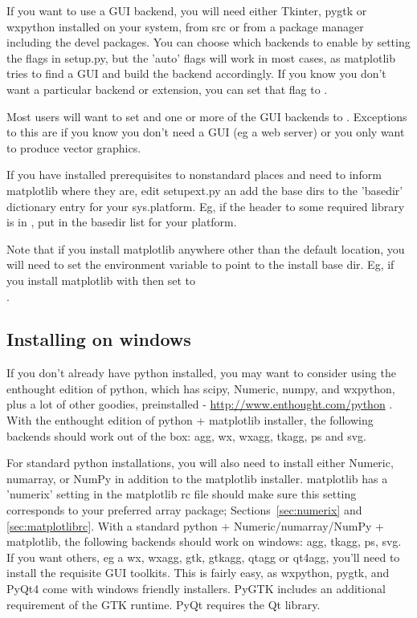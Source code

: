 \documentclass[twoside]{book}
\begin{document}
If you want to use a GUI backend, you will need either Tkinter, pygtk or 
wxpython installed on your system, from src or from a package manager 
including the devel packages.  You can choose which backends to enable 
by setting the flags in setup.py, but the 'auto' flags will work in most 
cases, as matplotlib tries to find a GUI and build the backend accordingly.  
If you know you don't want a particular backend or extension, you can set 
that flag to .
  
Most users will want to set  and one or more of
the GUI backends to .  Exceptions to this are if you know
you don't need a GUI (eg a web server) or you only want to produce
vector graphics.
  
If you have installed prerequisites to nonstandard places and need to
inform matplotlib where they are, edit setupext.py an add the base
dirs to the 'basedir' dictionary entry for your sys.platform.  Eg, if
the header to some required library is in
, put  in the
basedir list for your platform.
  
Note that if you install matplotlib anywhere other than the default
location, you will need to set the  environment
variable to point to the install base dir.  Eg, if you install
matplotlib with 
then set  to\\
.
 
    
\subsection{Installing on windows}

If you don't already have python installed, you may want to consider
using the enthought edition of python, which has scipy, Numeric, numpy, 
and wxpython, plus a lot of other goodies, preinstalled -
\url{http://www.enthought.com/python} .  With the enthought edition of
python + matplotlib installer, the following backends should work out
of the box: agg, wx, wxagg, tkagg, ps and svg.

For standard python installations, you will also need to install either 
Numeric, numarray, or NumPy in addition to the matplotlib installer.
matplotlib has a 'numerix' setting in the matplotlib rc file should make 
sure this setting corresponds to your preferred array package; 
Sections~\ref{sec:numerix} and \ref{sec:matplotlibrc}. With a standard 
python + Numeric/numarray/NumPy + matplotlib, the following 
backends should work on windows: agg, tkagg, ps, svg.  If you want 
others, eg a wx, wxagg, gtk, gtkagg, qtagg or qt4agg, you'll
need to install the requisite GUI toolkits.  This is fairly easy, as
wxpython, pygtk, and PyQt4 come with windows friendly installers.  
PyGTK includes an additional requirement of the GTK runtime. PyQt 
requires the Qt library.
\end{document}
